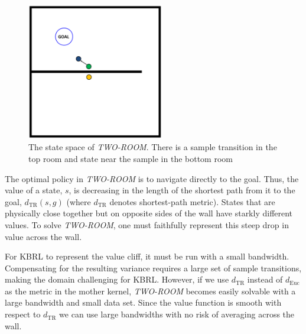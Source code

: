 \documentclass{article} %
\begin{document}
\begin{figure}[!!!ht]
  \centering
    \includegraphics[width=60mm]{../writeup/figs/tworoom.pdf}
  \caption[State Space]
{The state space of \textit{TWO-ROOM}. There is a sample transition in the top room
and state near the sample in the bottom room}
  \label{tworoom}
\end{figure}

The  optimal policy in \textit{TWO-ROOM} is to navigate directly to the goal.
Thus, the value of a state, $s$, is decreasing in the length of the shortest path
from it to the goal, $d_{\mathrm{TR}}(s,g)$ (where $d_{\mathrm{TR}}$ denotes
shortest-path metric).
States that are physically close together but on opposite sides of the
wall have starkly different values. To solve \textit{TWO-ROOM},
one must faithfully represent this steep drop in value across the wall. 

For KBRL to represent the value cliff, it must be run with a small bandwidth.
Compensating for the resulting variance requires a large set of sample transitions,
making the domain challenging for KBRL.
However, if we use $d_{\mathrm{TR}}$ instead of $d_{\mathrm{Euc}}$ as the
metric in the mother kernel, \textit{TWO-ROOM} becomes easily solvable with a large bandwidth
and small data set.
Since the value function is smooth with respect to $d_{\mathrm{TR}}$ we can
use large bandwidths with no risk of averaging across the wall.
\end{document}
